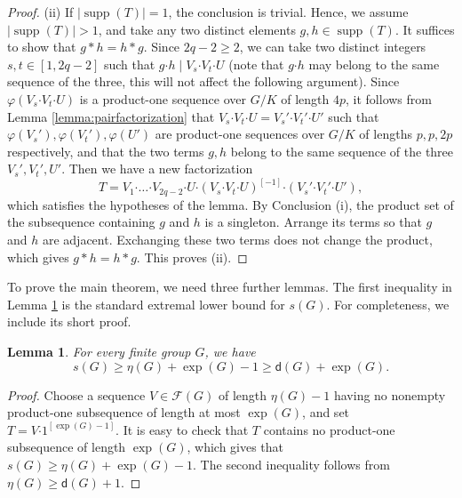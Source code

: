 \documentclass[a4paper, 12pt]{article}
\newtheorem{lemma}[theorem]{Lemma}
\theoremstyle{definition}
\DeclareMathOperator{\supp}{supp}
\begin{document}
\begin{proof}
(ii) If $|\supp(T)|=1$, the conclusion is trivial. Hence, we assume $|\supp(T)|>1$, and take any two distinct elements $g,h\in \supp(T)$. It suffices to show that $g*h=h*g$. Since $2q-2\geq 2$, we can take two distinct integers $s,t\in [1,2q-2]$ such that $g\boldsymbol{\cdot} h\mid V_s\boldsymbol{\cdot} V_t\boldsymbol{\cdot} U$ (note that $g\boldsymbol{\cdot} h$ may belong to the same sequence of the three, this will not affect the following argument).
Since $\varphi(V_s\boldsymbol{\cdot} V_t\boldsymbol{\cdot} U)$ is a product-one sequence over $G/K$ of length $4p$, it follows from
Lemma \ref{lemma:pairfactorization} that $V_s\boldsymbol{\cdot} V_t\boldsymbol{\cdot} U=V_s'\boldsymbol{\cdot} V_t'\boldsymbol{\cdot} U'$ such that $\varphi(V_s'), \varphi(V_t'), \varphi(U')$ are product-one sequences over $G/K$ of lengths $p, p, 2p$ respectively, and that
the two terms $g,h$ belong to the same sequence of the three $V_s', V_t', U'$. Then we have a new factorization
$$T=V_1\boldsymbol{\cdot}\ldots\boldsymbol{\cdot}V_{2q-2}
\boldsymbol{\cdot}U\boldsymbol{\cdot} (V_s\boldsymbol{\cdot} V_t\boldsymbol{\cdot} U)^{[-1]}\boldsymbol{\cdot} (V_s'\boldsymbol{\cdot} V_t'\boldsymbol{\cdot} U'),$$ which satisfies the hypotheses of the lemma.  By Conclusion (i), the product set of the subsequence containing $g$ and $h$ is a
singleton. Arrange its terms so that $g$ and $h$ are adjacent. Exchanging
these two terms does not change the product, which gives $g*h=h*g$. This proves (ii).
\end{proof}

To prove the main theorem, we need three further lemmas. The first
inequality in Lemma \ref{lemma:universallower} is the standard
extremal lower bound for $s(G)$. For completeness, we include its
short proof.


\begin{lemma}\label{lemma:universallower}
For every finite group $G$, we have $$s(G)\geq\eta(G)+\exp(G)-1\geq \mathsf d(G)+\exp(G).$$
\end{lemma}

\begin{proof}
Choose a sequence $V\in \mathcal{F}(G)$ of length $\eta(G)-1$ having no nonempty
product-one subsequence of length at most $\exp(G)$, and set
$T=V\boldsymbol{\cdot}1^{[\exp(G)-1]}.$ It is easy to check that $T$ contains no product-one subsequence of length $\exp(G)$, which gives that $s(G)\geq\eta(G)+\exp(G)-1$.
The second inequality follows from $\eta(G)\geq \mathsf d(G)+1$.
\end{proof}
\end{document}
